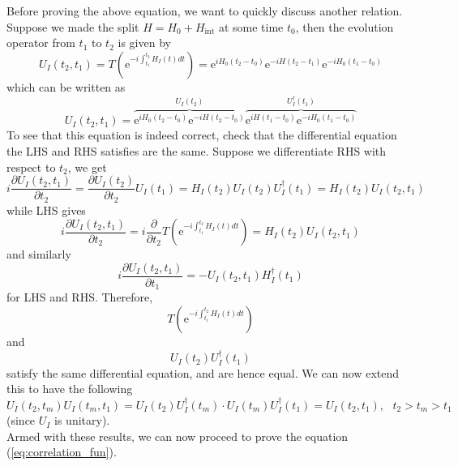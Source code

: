 \documentclass[11pt, notitlepage]{report}
\newcommand{\del}{\partial}
\newcommand{\e}{\mathrm{e}}
\numberwithin{equation}{section}
\begin{document}
Before proving the above equation, we want to quickly discuss another relation. Suppose we made the split \(H = H_0 + H_{\text{int}}\) at some time \(t_0\), then the evolution operator from \(t_1\) to \(t_2\) is given by 
\begin{equation*}
    U_I(t_2, t_1) = T\left( \e^{-i\int_{t_1}^{t_2}H_I(t)dt} \right) = \e^{iH_0(t_2 - t_0)} \e^{-iH(t_2 - t_1)} \e^{-iH_0(t_1-t_0)}
\end{equation*}
which can be written as 
\begin{equation*}
    U_I(t_2, t_1) = \overbrace{\e^{iH_0(t_2 - t_0)} \e^{-iH(t_2 - t_0)}}^{U_I(t_2)}  \overbrace{\e^{iH(t_1 - t_0)}\e^{-iH_0(t_1-t_0)}}^{U^\dagger_I(t_1)}
\end{equation*}
To see that this equation is indeed correct, check that the differential equation the LHS and RHS satisfies are the same. Suppose we differentiate RHS with respect to \(t_2\), we get 
\begin{equation*}
    i\frac{\del U_I(t_2, t_1)}{\del t_2} = \frac{\del U_I(t_2)}{\del t_2} U_I(t_1) = H_I(t_2) U_I(t_2)U^\dagger_I(t_1) = H_I(t_2) U_I(t_2, t_1) 
\end{equation*}
while LHS gives 
\begin{equation*}
    i\frac{\del U_I(t_2, t_1)}{\del t_2} = i\frac{\del}{\del t_2} T\left( \e^{-i\int_{t_1}^{t_2}H_I(t)dt} \right) = H_I(t_2) U_I(t_2, t_1)
\end{equation*}
and similarly 
\begin{equation*}
    i\frac{\del U_I(t_2, t_1)}{\del t_1} = - U_I(t_2, t_1)H_I^\dagger(t_1)
\end{equation*}
for LHS and RHS. Therefore, 
\begin{equation*}
    T\left( \e^{-i\int_{t_1}^{t_2}H_I(t)dt} \right)
\end{equation*}
and 
\begin{equation*}
    U_I(t_2) U^\dagger_I(t_1)
\end{equation*}
satisfy the same differential equation, and are hence equal. We can now extend this to have the following 
\begin{equation*}
    U_I(t_2, t_m)U_I(t_m, t_1) = U_I(t_2)U_I^\dagger(t_m)\cdot U_I(t_m)U_I^\dagger(t_1) = U_I(t_2, t_1),~~~t_2>t_m>t_1
\end{equation*}
(since \(U_I\) is unitary).\\

Armed with these results, we can now proceed to prove the equation (\ref{eq:correlation_fun}).
\end{document}
